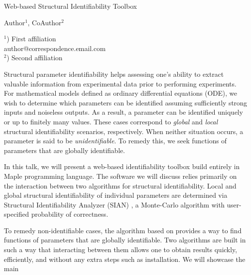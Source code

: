 \documentclass[a4paper]{article}
\begin{document}

\Large
\begin{center}
    Web-based Structural Identifiability Toolbox \\

    \hspace{10pt}

    \large
    Author$^1$, CoAuthor$^2$ \\

    \hspace{10pt}

    \small
    $^1$) First affiliation\\
    author@correspondence.email.com\\
    $^2$) Second affiliation

\end{center}

\hspace{10pt}

\normalsize

Structural parameter identifiability helps assessing one's ability to extract valuable information from experimental data prior to performing experiments. For mathematical models defined as ordinary differential equations (ODE), we wish to determine which parameters can be identified assuming sufficiently strong inputs and noiseless outputs. As a result, a parameter can be identified uniquely or up to finitely many values. These cases correspond to \emph{global} and \emph{local} structural identifiability scenarios, respectively. When neither situation occurs, a parameter is said to be \emph{unidentifiable}. To remedy this, we seek functions of parameters that are globally identifiable.

In this talk, we will present a web-based identifiability toolbox build entirely in Maple programming language. The software we will discuss relies primarily on the interaction between two algorithms for structural identifiability. Local and global structural identifiability of individual parameters are determined via Structural Identifiability Analyzer (SIAN) \cite{hong_global_2020,hong_sian_2019}, a Monte-Carlo algorithm with user-specified probability of correctness.

To remedy non-identifiable cases, the algorithm based on \cite{ovchinnikov2020computing,ovchinnikov2020multi} provides a way to find functions of parameters that are globally identifiable. Two algorithms are built in such a way that interacting between them allows one to obtain results quickly, efficiently, and without any extra steps such as installation. We will showcase the main

\printbibliography{}
\end{document}
